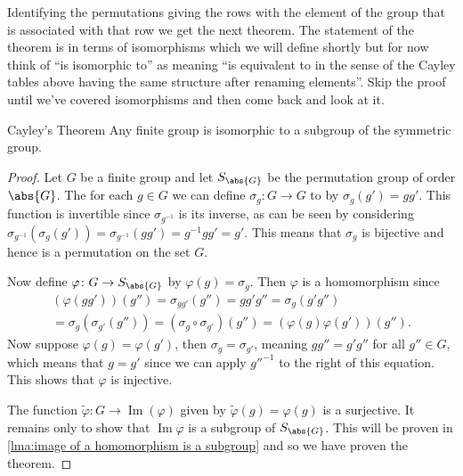 \documentclass[fleqn]{NotesClass}
\DeclareMathOperator{\image}{Im}
\begin{document}
    Identifying the permutations giving the rows with the element of the group that is associated with that row we get the next theorem.
    The statement of the theorem is in terms of isomorphisms which we will define shortly but for now think of \enquote{is isomorphic to} as meaning \enquote{is equivalent to in the sense of the Cayley tables above having the same structure after renaming elements}.
    Skip the proof until we've covered isomorphisms and then come back and look at it.
    
    \begin{thm}{Cayley's Theorem}{}
        Any finite group is isomorphic to a subgroup of the symmetric group.
        \begin{proof}
            Let \(G\) be a finite group and let \(S_{\abs{G}}\) be the permutation group of order \(\abs{G}\).
            The for each \(g \in G\) we can define \(\sigma_g \colon G \to G\) to by \(\sigma_g(g') = gg'\).
            This function is invertible since \(\sigma_{g^{-1}}\) is its inverse, as can be seen by considering \(\sigma_{g^{-1}}(\sigma_{g}(g')) = \sigma_{g^{-1}}(gg') = g^{-1}gg' = g'\).
            This means that \(\sigma_g\) is bijective and hence is a permutation on the set \(G\).
            
            Now define \(\varphi\colon G \to S_{\abs{G}}\) by \(\varphi(g) = \sigma_g\).
            Then \(\varphi\) is a homomorphism since
            \begin{multline}
                (\varphi(gg'))(g'') = \sigma_{gg'}(g'') = gg'g'' = \sigma_g(g'g'')\\
                = \sigma_{g}(\sigma_{g'}(g'')) = (\sigma_g \circ \sigma_{g'})(g'') = (\varphi(g)\varphi(g'))(g'').
            \end{multline}
            Now suppose \(\varphi(g) = \varphi(g')\), then \(\sigma_g = \sigma_{g'}\), meaning \(gg'' = g'g''\) for all \(g'' \in G\), which means that \(g = g'\) since we can apply \(g''^{-1}\) to the right of this equation.
            This shows that \(\varphi\) is injective.
            
            The function \(\tilde{\varphi} \colon G \to \image(\varphi)\) given by \(\tilde{\varphi}(g) = \varphi(g)\) is a surjective.
            It remains only to show that \(\image\varphi\) is a subgroup of \(S_{\abs{G}}\).
            This will be proven in \cref{lma:image of a homomorphism is a subgroup} and so we have proven the theorem.
        \end{proof}
    \end{thm}
    
\end{document}
